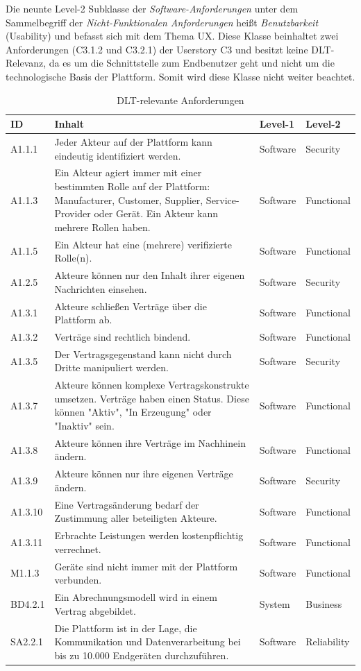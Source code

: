 Die neunte Level-2 Subklasse der \textit{Software-Anforderungen} unter dem Sammelbegriff der \textit{Nicht-Funktionalen Anforderungen} heißt \textit{Benutzbarkeit} (Usability) und befasst sich mit dem Thema \ac{UX}. Diese Klasse beinhaltet zwei Anforderungen (C3.1.2 und C3.2.1) der Userstory C3 und besitzt keine \ac{DLT}-Relevanz, da es um die Schnittstelle zum Endbenutzer geht und nicht um die technologische Basis der Plattform. Somit wird diese Klasse nicht weiter beachtet.\\


\begin{table}[htbp]
\caption{DLT-relevante Anforderungen}
\label{tab:dlt_relevant}
\begin{tabu} to \textwidth {XX[3]XX}
\toprule
\textbf{ID} & \textbf{Inhalt} & \textbf{Level-1} & \textbf{Level-2} \\ \midrule
A1.1.1 & Jeder Akteur auf der Plattform kann eindeutig identifiziert werden. & Software & Security \\
A1.1.3 & Ein Akteur agiert immer mit einer bestimmten Rolle auf der Plattform: Manufacturer, Customer, Supplier, Service-Provider oder Gerät. Ein Akteur kann mehrere Rollen haben. & Software & Functional \\
A1.1.5 & Ein Akteur hat eine (mehrere) verifizierte Rolle(n). & Software & Functional \\
A1.2.5 & Akteure können nur den Inhalt ihrer eigenen Nachrichten einsehen. & Software & Security \\
A1.3.1 & Akteure schließen Verträge über die Plattform ab. & Software & Functional \\
A1.3.2 & Verträge sind rechtlich bindend. & Software & Functional \\
A1.3.5 & Der Vertragsgegenstand kann nicht durch Dritte manipuliert werden. & Software & Security \\
A1.3.7 & Akteure können komplexe Vertragskonstrukte umsetzen. Verträge haben einen Status. Diese können "Aktiv", "In Erzeugung" oder "Inaktiv" sein. & Software & Functional \\
A1.3.8 & Akteure können ihre Verträge im Nachhinein ändern. & Software & Functional \\
A1.3.9 & Akteure können nur ihre eigenen Verträge ändern. & Software & Security \\
A1.3.10 & Eine Vertragsänderung bedarf der Zustimmung aller beteiligten Akteure. & Software & Functional \\
A1.3.11 & Erbrachte Leistungen werden kostenpflichtig verrechnet. & Software & Functional \\
M1.1.3 & Geräte sind nicht immer mit der Plattform verbunden. & Software & Functional \\
BD4.2.1 & Ein Abrechnungsmodell wird in einem Vertrag abgebildet. & System & Business \\
SA2.2.1 & Die Plattform ist in der Lage, die Kommunikation und Datenverarbeitung bei bis zu 10.000 Endgeräten durchzuführen. & Software & Reliability \\ \bottomrule
\end{tabu}
\end{table}
